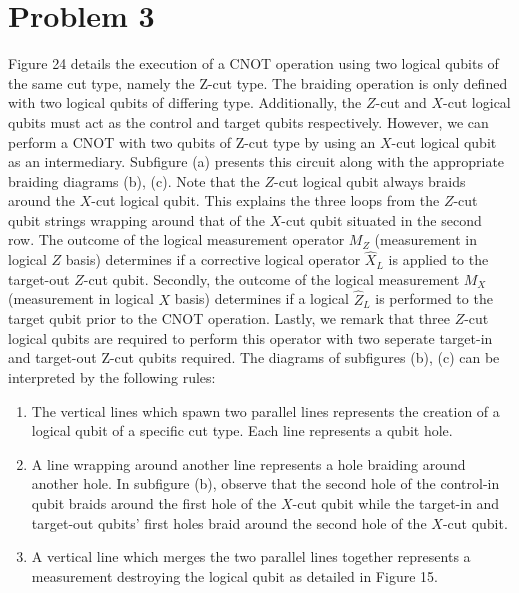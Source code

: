 \documentclass[12pt]{article}%
\begin{document}
\section*{Problem 3}
Figure 24 details the execution of a CNOT operation using two logical qubits of the same cut type, namely the Z-cut type. The braiding operation is only defined with two logical qubits of differing type. Additionally, the $Z$-cut and $X$-cut logical qubits must act as the control and target qubits respectively. However, we can perform a CNOT with two qubits of Z-cut type by using an $X$-cut logical qubit as an intermediary. Subfigure (a) presents this circuit along with the appropriate braiding diagrams (b), (c). Note that the $Z$-cut logical qubit always braids around the $X$-cut logical qubit. This explains the three loops from the $Z$-cut qubit strings wrapping around that of the $X$-cut qubit situated in the second row. The outcome of the logical measurement operator $M_Z$ (measurement in logical $Z$ basis) determines if a corrective logical operator $\hat{X}_L$ is applied to the target-out $Z$-cut qubit. Secondly, the outcome of the logical measurement $M_X$ (measurement in logical $X$ basis) determines if a logical $\hat{Z}_L$ is performed to the target qubit prior to the CNOT operation. Lastly, we remark that three $Z$-cut logical qubits are required to perform this operator with two seperate target-in and target-out Z-cut qubits required.
The diagrams of subfigures (b), (c) can be interpreted by the following rules:
\begin{enumerate}
\item The vertical lines which spawn two parallel lines represents the creation of a logical qubit of a specific cut type. Each line represents a qubit hole.
\item A line wrapping around another line represents a hole braiding around another hole. In subfigure (b), observe that the second hole of the control-in qubit braids around the first hole of the $X$-cut qubit while the target-in and target-out qubits' first holes braid around the second hole of the $X$-cut qubit.
\item A vertical line which merges the two parallel lines together represents a measurement destroying the logical qubit as detailed in Figure 15.
\end{enumerate}
\end{document}
